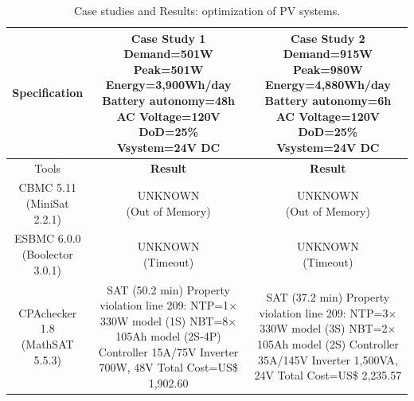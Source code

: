 \documentclass[10pt,conference]{IEEEtran}
\begin{document}
\begin{table}
\caption{Case studies and Results: optimization of PV systems.}\label{tab1}
\begin{scriptsize}
\begin{tabular}{|c|c|c|}
\hline
\hline
Specification & \makecell{ \textbf{Case Study 1} \\ Demand=501W \\ Peak=501W \\ Energy=3,900Wh/day\\Battery autonomy=48h\\AC Voltage=120V\\DoD=25\%\\Vsystem=24V DC} & \makecell{\textbf{Case Study 2}\\ Demand=915W \\ Peak=980W \\Energy=4,880Wh/day\\Battery autonomy=6h\\AC Voltage=120V\\DoD=25\%\\Vsystem=24V DC}\\
\hline
\hline
Tools & \textbf{Result} & \textbf{Result}\\
\hline
\makecell{CBMC 5.11 \\(MiniSat 2.2.1)} & \makecell{UNKNOWN \\(Out of Memory)} & \makecell{UNKNOWN \\(Out of Memory)}\\
\hline
\makecell{ESBMC 6.0.0 \\(Boolector 3.0.1)} & \makecell{UNKNOWN \\(Timeout)} & \makecell{UNKNOWN \\(Timeout)} \\
\hline
\makecell{CPAchecker 1.8 \\(MathSAT 5.5.3)} & \makecell{SAT (50.2 min) \\ Property violation line 209: \\NTP=1$\times$330W model (1S)\\NBT=8$\times$105Ah model (2S-4P)\\ Controller 15A/75V\\Inverter 700W, 48V \\ Total Cost=US\$ 1,902.60} & \makecell {SAT (37.2 min) \\ Property violation line 209:  \\NTP=3$\times$330W model (3S)\\NBT=2$\times$105Ah model (2S)\\ Controller 35A/145V \\ Inverter 1,500VA, 24V \\ Total Cost=US\$ 2,235.57}\\
\hline
\hline
\end{tabular}
\end{scriptsize}
\end{table}
\end{document}
